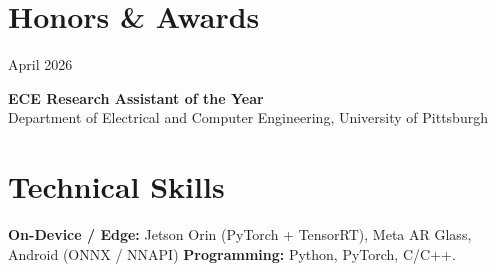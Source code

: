 \documentclass[11pt, letterpaper]{article}
\newenvironment{datedentry}[1]{%
  \par\noindent
  \begin{minipage}[t]{2.8cm}\raggedright\small #1\end{minipage}%
  \hspace{0.3cm}%
  \begin{minipage}[t]{\dimexpr\linewidth-3.1cm\relax}\raggedright
}{\end{minipage}\par\medskip}
\begin{document}
\section{Honors \& Awards}

\begin{datedentry}{April 2026}
\textbf{ECE Research Assistant of the Year}\\
Department of Electrical and Computer Engineering, University of Pittsburgh
\end{datedentry}

\section{Technical Skills}
\textbf{On-Device / Edge:} Jetson Orin (PyTorch + TensorRT), Meta AR Glass, Android (ONNX / NNAPI)
\textbf{Programming:} Python, PyTorch, C/C++.
\end{document}
